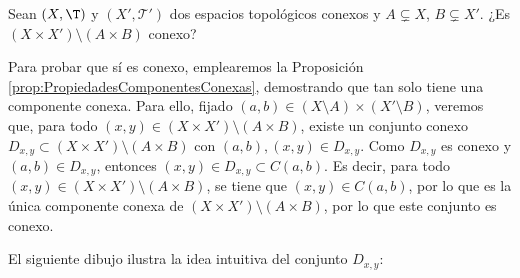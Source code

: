 \begin{ejercicio}
    Sean $(X, \T)$ y $(X', \mathcal{T'})$ dos espacios topológicos conexos y $A \subsetneq X$, $B \subsetneq X'$. ¿Es $(X \times X') \setminus (A \times B)$ conexo?

    Para probar que sí es conexo, emplearemos la Proposición \ref{prop:PropiedadesComponentesConexas}, demostrando que
    tan solo tiene una componente conexa. Para ello, fijado $(a,b)\in (X\setminus A)\times (X'\setminus B)$, veremos que,
    para todo $(x,y)\in (X \times X') \setminus (A \times B)$, existe un conjunto conexo
    $D_{x,y}\subset (X \times X') \setminus (A \times B)$ con $(a,b),(x,y)\in D_{x,y}$.
    Como $D_{x,y}$ es conexo y $(a,b)\in D_{x,y}$, entonces $(x,y)\in D_{x,y}\subset C(a,b)$.
    Es decir, para todo $(x,y)\in (X \times X') \setminus (A \times B)$, se tiene que $(x,y)\in C(a,b)$, por lo que
    es la única componente conexa de $(X \times X') \setminus (A \times B)$, por lo que este conjunto es conexo.

    El siguiente dibujo ilustra la idea intuitiva del conjunto $D_{x,y}$:
    \begin{figure}[H]
        \centering
        \begin{subfigure}[c]{0.45\linewidth}
            \centering
\end{subfigure}
\end{figure}
\end{ejercicio}

